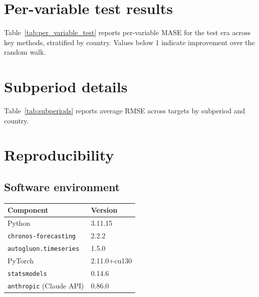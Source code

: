 \documentclass[12pt,a4paper]{article}
\begin{document}
\newpage
\begin{appendices}

\section{Per-variable test results}
\label{app:per_variable}

Table~\ref{tab:per_variable_test} reports per-variable MASE for the test era across key methods, stratified by country. Values below 1 indicate improvement over the random walk.

\begin{table}[H]
\centering
\caption{Test era MASE by variable and country}
\label{tab:per_variable_test}

\end{table}


\section{Subperiod details}
\label{app:subperiods}

Table~\ref{tab:subperiods} reports average RMSE across targets by subperiod and country.

\begin{table}[H]
\centering
\caption{Subperiod analysis (average RMSE across targets)}
\label{tab:subperiods}

\end{table}


\section{Reproducibility}
\label{app:reproducibility}

\subsection*{Software environment}

\begin{table}[H]
\centering
\small
\begin{tabular}{ll}
\toprule
Component & Version \\
\midrule
Python & 3.11.15 \\
\texttt{chronos-forecasting} & 2.2.2 \\
\texttt{autogluon.timeseries} & 1.5.0 \\
PyTorch & 2.11.0+cu130 \\
\texttt{statsmodels} & 0.14.6 \\
\texttt{anthropic} (Claude API) & 0.86.0 \\
\bottomrule
\end{tabular}
\end{table}


\end{appendices}
\end{document}
